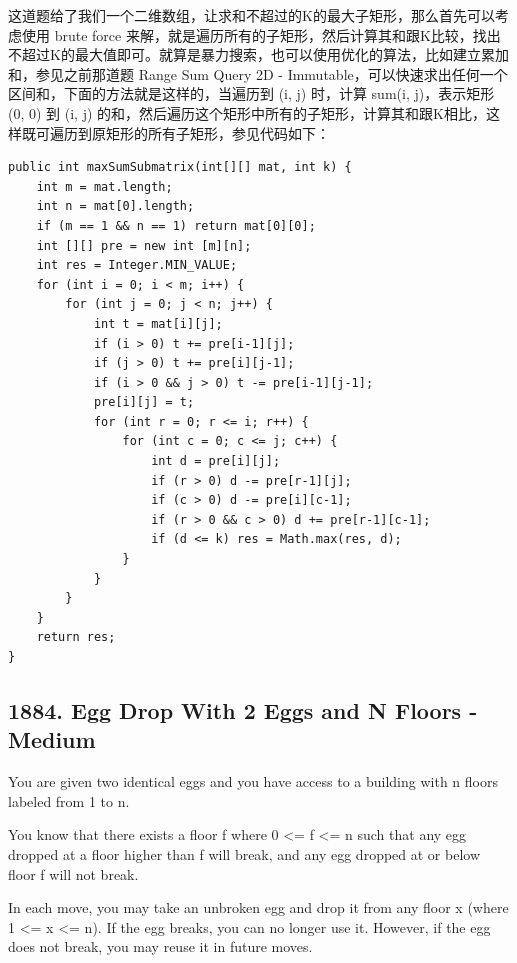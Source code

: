 \documentclass[9pt, b5paaper]{book}
\begin{document}
\begin{enumerate}
这道题给了我们一个二维数组，让求和不超过的K的最大子矩形，那么首先可以考虑使用 brute force 来解，就是遍历所有的子矩形，然后计算其和跟K比较，找出不超过K的最大值即可。就算是暴力搜索，也可以使用优化的算法，比如建立累加和，参见之前那道题 Range Sum Query 2D - Immutable，可以快速求出任何一个区间和，下面的方法就是这样的，当遍历到 (i, j) 时，计算 sum(i, j)，表示矩形 (0, 0) 到 (i, j) 的和，然后遍历这个矩形中所有的子矩形，计算其和跟K相比，这样既可遍历到原矩形的所有子矩形，参见代码如下：

\begin{verbatim}
public int maxSumSubmatrix(int[][] mat, int k) {
    int m = mat.length;
    int n = mat[0].length;
    if (m == 1 && n == 1) return mat[0][0];
    int [][] pre = new int [m][n];
    int res = Integer.MIN_VALUE;
    for (int i = 0; i < m; i++) {
        for (int j = 0; j < n; j++) {
            int t = mat[i][j];
            if (i > 0) t += pre[i-1][j];
            if (j > 0) t += pre[i][j-1];
            if (i > 0 && j > 0) t -= pre[i-1][j-1];
            pre[i][j] = t;
            for (int r = 0; r <= i; r++) {
                for (int c = 0; c <= j; c++) {
                    int d = pre[i][j];
                    if (r > 0) d -= pre[r-1][j];
                    if (c > 0) d -= pre[i][c-1];
                    if (r > 0 && c > 0) d += pre[r-1][c-1];
                    if (d <= k) res = Math.max(res, d);
                }
            }
        }
    }
    return res;
}
\end{verbatim}
\end{enumerate}

\subsection{1884. Egg Drop With 2 Eggs and N Floors - Medium}
\label{sec-1-4-48}
You are given two identical eggs and you have access to a building with n floors labeled from 1 to n.

You know that there exists a floor f where 0 <= f <= n such that any egg dropped at a floor higher than f will break, and any egg dropped at or below floor f will not break.

In each move, you may take an unbroken egg and drop it from any floor x (where 1 <= x <= n). If the egg breaks, you can no longer use it. However, if the egg does not break, you may reuse it in future moves.
\end{document}
